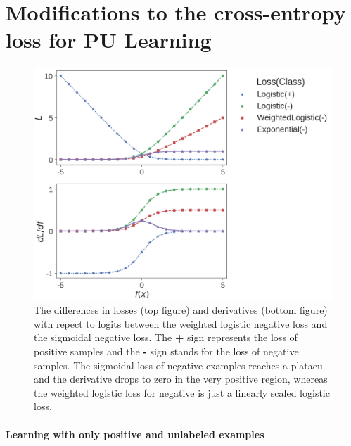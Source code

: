 \section{Modifications to the cross-entropy loss for PU Learning}
\label{sec:pulearning}



\begin{figure}[t]
\centering
   \includegraphics[width=1.05\linewidth]{img/losses}
\caption{
The differences in losses (top figure) and derivatives (bottom figure) with repect to logits between the weighted logistic negative loss and the sigmoidal negative loss.
The \textbf{+} sign represents the loss of positive samples and the \textbf{-} sign stands for the loss of negative samples.
The sigmoidal loss of negative examples reaches a plataeu and the derivative drops to zero in the very positive region, whereas the weighted logistic loss for negative is just a linearly scaled logistic loss.
}
\label{fig:losses}
\end{figure}


\paragraph{Learning with only positive and unlabeled examples}

